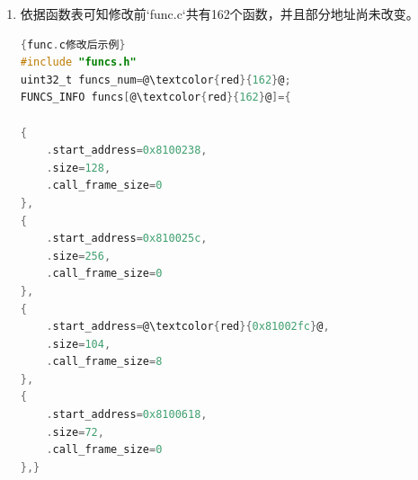\documentclass[UTF8,12pt,a4paper]{ctexart}
\numberwithin{figure}{section}
\begin{document}
\begin{enumerate}
\begin{enumerate}
\begin{figure}
                        \label{gl}
                    \end{figure}
              \item 依据函数表可知修改前`func.c`共有162个函数，并且部分地址尚未改变。
                    \begin{lstlisting}[language=C]{func.c修改后示例}
#include "funcs.h"
uint32_t funcs_num=@\textcolor{red}{162}@;
FUNCS_INFO funcs[@\textcolor{red}{162}@]={

{
    .start_address=0x8100238,
    .size=128,
    .call_frame_size=0
},
{
    .start_address=0x810025c,
    .size=256,
    .call_frame_size=0
},
{
    .start_address=@\textcolor{red}{0x81002fc}@,
    .size=104,
    .call_frame_size=8
},
{
    .start_address=0x8100618,
    .size=72,
    .call_frame_size=0
},}
                                         \end{lstlisting}
                    

\end{enumerate}
\end{enumerate}
\end{document}
